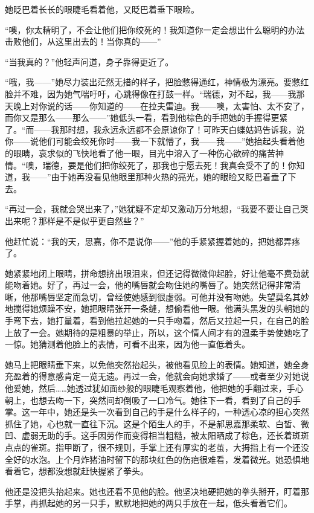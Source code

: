 \par 她眨巴着长长的眼睫毛看着他，又眨巴着垂下眼睑。
\par “噢，你太精明了，不会让他们把你绞死的！我知道你一定会想出什么聪明的办法击败他们，从这里出去的！当你真的——”
\par “当我真的？”他轻声问道，身子靠得更近了。
\par “哦，我——”她尽力装出茫然无措的样子，把脸憋得通红，神情极为漂亮。要憋红脸并不难，因为她气喘吁吁，心跳得像在打鼓一样。“瑞德，对不起，我——我那天晚上对你说的话——你知道的——在拉夫雷迪。我——噢，太害怕、太不安了，而你又是那么——那么——”她低头一看，看到他棕色的手把她的手握得更紧了。“而——我那时想，我永远永远都不会原谅你了！可昨天白蝶姑妈告诉我，说你——说他们可能会绞死你时——我一下就懵了，我——我——”她抬起头看着他的眼睛，哀求似的飞快地看了他一眼，目光中溶入了一种伤心欲碎的痛苦神情。“噢，瑞德，要是他们把你绞死了，那我也宁愿去死！我真会受不了的！你知道，我——”由于她再没看见他眼里那种火热的亮光，她的眼睑又眨巴着垂了下去。
\par “再过一会，我就会哭出来了，”她犹疑不定却又激动万分地想，“我要不要让自己哭出来呢？那样是不是似乎更自然些？”
\par 他赶忙说：“我的天，思嘉，你不是说你——”他的手紧紧握着她的，把她都弄疼了。
\par 她紧紧地闭上眼睛，拼命想挤出眼泪来，但还记得微微仰起脸，好让他毫不费劲就能吻着她。好了，再过一会，他的嘴唇就会吻住她的嘴唇了。她突然记得非常清晰，他那嘴唇坚定而急切，曾经使她感到很虚弱。可他并没有吻她。失望莫名其妙地搅得她烦躁不安，她把眼睛张开一条缝，想偷看他一眼。他满头黑发的头朝她的手弯下去，她打量着，看到他拉起她的一只手吻着，然后又拉起一只，在自己的脸上放了一会。她期待的是粗暴的举止，所以，这个情人间才有的温柔手势使她吃了一惊。她猜测着他脸上的表情，可看不出来，因为他一直低着头。
\par 她马上把眼睛垂下来，以免他突然抬起头，被他看见脸上的表情。她知道，她全身充盈着的得意感肯定一览无遗。再过一会，他就会向她求婚了——或者至少对她说他爱她，然后……她透过犹如面纱般的眼睫毛观察着他，他把她的手翻过来，手心朝上，也想去吻一下，突然间却倒吸了一口冷气。她往下一看，看到了自己的手掌。这一年中，她还是头一次看到自己的手是什么样子的，一种透心凉的担心突然抓住了她，心也就一直往下沉。这是个陌生人的手，不是郝思嘉那柔软、白皙、微凹、虚弱无助的手。这手因劳作而变得相当粗糙，被太阳晒成了棕色，还长着斑斑点点的雀斑。指甲断了，很不规则，手掌上还有厚实的老茧，大拇指上有一个还没全好的水泡。上个月炸猪油时留下的那块红色的伤疤很难看，发着微光。她恐惧地看着它，想都没想就赶快握紧了拳头。
\par 他还是没把头抬起来。她也还看不见他的脸。他坚决地硬把她的拳头掰开，盯着那手掌，再抓起她的另一只手，默默地把她的两只手放在一起，低头看着它们。
